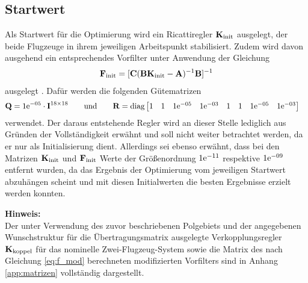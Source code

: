 \subsection{Startwert}
Als Startwert für die Optimierung wird ein Ricattiregler ${\boldsymbol{\mathrm{K}}}_{\textnormal{init}}$ ausgelegt, der beide Flugzeuge in ihrem jeweiligen Arbeitspunkt stabilisiert. Zudem wird davon ausgehend ein entsprechendes Vorfilter unter Anwendung der Gleichung
\begin{align}
	{\ensuremath{\boldsymbol{\mathrm{F}}}}_{\textnormal{init}} = [{\boldsymbol{\mathrm{C}}}({\boldsymbol{\mathrm{B}}}{\boldsymbol{\mathrm{K}}}_{\textnormal{init}}-{\boldsymbol{\mathrm{A}}})^{-1}{\boldsymbol{\mathrm{B}}}]^{-1}
\end{align}
ausgelegt  \cite{Mehrgr}. Dafür werden die folgenden Gütematrizen
\begin{align*}
	{\ensuremath{\boldsymbol{\mathrm{Q}}}} = 1\mathrm{e}^{-05}\cdot{\ensuremath{\boldsymbol{\mathrm{I}}}}^{18\times18}\qquad \textnormal{und} \qquad & 	{\boldsymbol{\mathrm{R}}} = \textnormal{diag}\begin{bmatrix}
	1 & 1 & 1\mathrm{e}^{-05} &  1\mathrm{e}^{-03} & 1 & 1 & 1\mathrm{e}^{-05} &  1\mathrm{e}^{-03}
	\end{bmatrix}
\end{align*}
verwendet. Der daraus entstehende Regler wird an dieser Stelle lediglich aus Gründen der Vollständigkeit erwähnt und soll nicht weiter betrachtet werden, da er nur als Initialisierung dient. Allerdings sei ebenso erwähnt, dass bei den Matrizen ${\boldsymbol{\mathrm{K}}}_{\textnormal{init}}$ und ${\boldsymbol{\mathrm{F}}}_{\textnormal{init}}$ Werte der Größenordnung $1\mathrm{e}^{-11}$ respektive $1\mathrm{e}^{-09}$ entfernt wurden, da das Ergebnis der Optimierung vom jeweiligen Startwert abzuhängen scheint und mit diesen Initialwerten die besten Ergebnisse erzielt werden konnten.

\textbf{Hinweis:} \\
Der unter Verwendung des zuvor beschriebenen Polgebiets und der angegebenen Wunschstruktur für die Übertragungsmatrix ausgelegte Verkopplungsregler ${\boldsymbol{\mathrm{K}}}_{\textnormal{koppel}}$ für das nominelle Zwei-Flugzeug-System sowie die Matrix des nach Gleichung \ref{eq:f_mod} berechneten modifizierten Vorfilters sind in Anhang \ref{app:matrizen} vollständig dargestellt.
